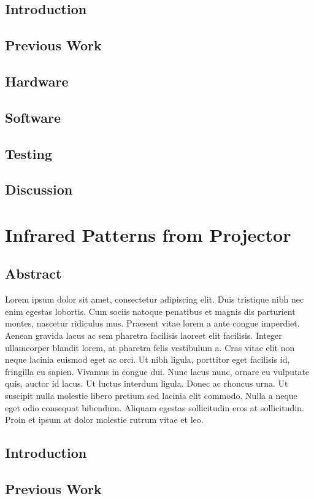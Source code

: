 \documentclass[12pt]{report}	%
\begin{document}
	\section{Introduction}
	\section{Previous Work}
	\section{Hardware}
	\section{Software}
	\section{Testing}
	\section{Discussion}
	
\chapter{Infrared Patterns from Projector}
	\section{Abstract}
	Lorem ipsum dolor sit amet, consectetur adipiscing elit. Duis tristique nibh nec enim egestas lobortis. Cum sociis natoque penatibus et magnis dis parturient montes, nascetur ridiculus mus. Praesent vitae lorem a ante congue imperdiet. Aenean gravida lacus ac sem pharetra facilisis laoreet elit facilisis. Integer ullamcorper blandit lorem, at pharetra felis vestibulum a. Cras vitae elit non neque lacinia euismod eget ac orci. Ut nibh ligula, porttitor eget facilisis id, fringilla eu sapien. Vivamus in congue dui. Nunc lacus nunc, ornare eu vulputate quis, auctor id lacus. Ut luctus interdum ligula. Donec ac rhoncus urna. Ut suscipit nulla molestie libero pretium sed lacinia elit commodo. Nulla a neque eget odio consequat bibendum. Aliquam egestas sollicitudin eros at sollicitudin. Proin et ipsum at dolor molestie rutrum vitae et leo.

	\section{Introduction}
	\section{Previous Work}
\end{document}
